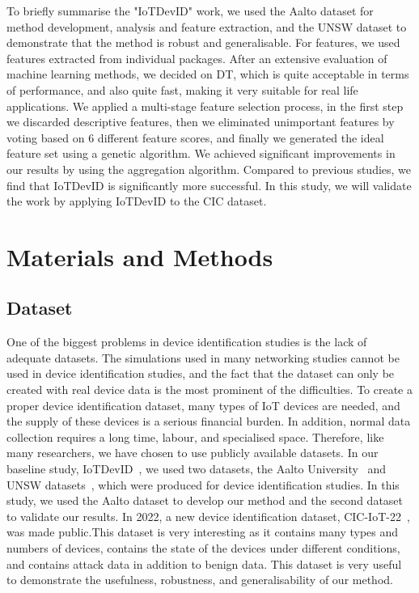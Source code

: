 \documentclass[journal]{IEEEtran}
\begin{document}
To briefly summarise the "IoTDevID" work, we used the Aalto dataset for method development, analysis and feature extraction, and the UNSW dataset to demonstrate that the method is robust and generalisable. For features, we used features extracted from individual packages. After an extensive evaluation of machine learning methods, we decided on DT, which is quite acceptable in terms of performance, and also quite fast, making it very suitable for real life applications. We applied a multi-stage feature selection process, in the first step we discarded descriptive features, then we eliminated unimportant features by voting based on 6 different feature scores, and finally we generated the ideal feature set using a genetic algorithm. We achieved significant improvements in our results by using the aggregation algorithm. Compared to previous studies, we find that IoTDevID is significantly more successful. In this study, we will validate the work by applying IoTDevID to the CIC dataset.











\section{Materials and Methods}
\subsection{Dataset}


One of the biggest problems in device identification studies is the lack of adequate datasets. The simulations used in many networking studies cannot be used in device identification studies, and the fact that the dataset can only be created with real device data is the most prominent of the difficulties. To create a proper device identification dataset, many types of IoT devices are needed, and the supply of these devices is a serious financial burden. In addition, normal data collection requires a long time, labour, and specialised space. Therefore, like many researchers, we have chosen to use publicly available datasets. In our baseline study, IoTDevID~\cite{kostas2022IoTDevID}, we used two datasets, the Aalto  University~\cite{miettinen2017iot,aalto2017dataset} and UNSW datasets~\cite{sivanathan2018classifying}, which were produced for device identification studies. In this study, we used the Aalto dataset to develop our method and the second dataset to validate our results. In 2022, a new device identification dataset, CIC-IoT-22~\cite{CIC}, was made public.This dataset is very interesting as it contains many types and numbers of devices, contains the state of the devices under different conditions, and contains attack data in addition to benign data.  This dataset is very useful to demonstrate the usefulness, robustness, and generalisability of our method. 
\end{document}
